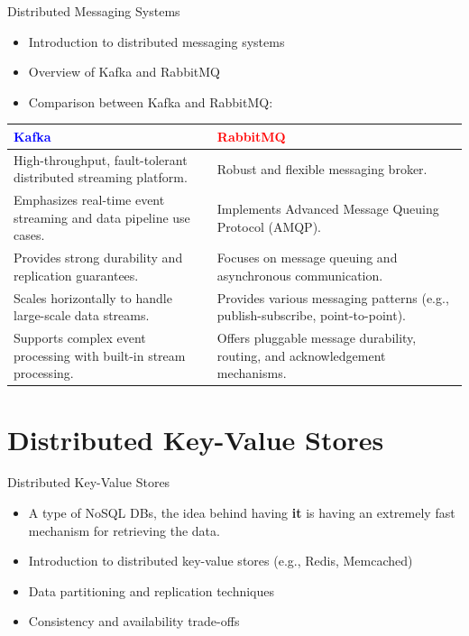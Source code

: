 \documentclass{beamer}
\begin{document}
\begin{frame}{Distributed Messaging Systems}
  \begin{itemize}
    \item Introduction to distributed messaging systems
    \item Overview of Kafka and RabbitMQ
    \item Comparison between Kafka and RabbitMQ:
  \end{itemize}

  \begin{table}[h]
    \centering
    \footnotesize
    \renewcommand{\arraystretch}{1.5}
    \begin{tabular}{|p{}|p{}|}
      \hline
      \rowcolor[RGB]{232,232,232}
      \textbf{\textcolor{blue}{Kafka}} & \textbf{\textcolor{red}{RabbitMQ}} \\
      \hline
      High-throughput, fault-tolerant distributed streaming platform. &
      Robust and flexible messaging broker. \\
      \hline
      Emphasizes real-time event streaming and data pipeline use cases. &
      Implements Advanced Message Queuing Protocol (AMQP). \\
      \hline
      Provides strong durability and replication guarantees. &
      Focuses on message queuing and asynchronous communication. \\
      \hline
      Scales horizontally to handle large-scale data streams. &
      Provides various messaging patterns (e.g., publish-subscribe, point-to-point). \\
      \hline
      Supports complex event processing with built-in stream processing. &
      Offers pluggable message durability, routing, and acknowledgement mechanisms. \\
      \hline
    \end{tabular}
  \end{table}
\end{frame}


\section{Distributed Key-Value Stores}
\begin{frame}{Distributed Key-Value Stores}
	  
  \begin{itemize}
  	\item[] A type of NoSQL DBs, the idea behind having \textbf{it} is having an extremely fast mechanism for retrieving the data.
    \item Introduction to distributed key-value stores (e.g., Redis, Memcached)
    \item Data partitioning and replication techniques
    \item Consistency and availability trade-offs
  \end{itemize}
\end{frame}
\end{document}

